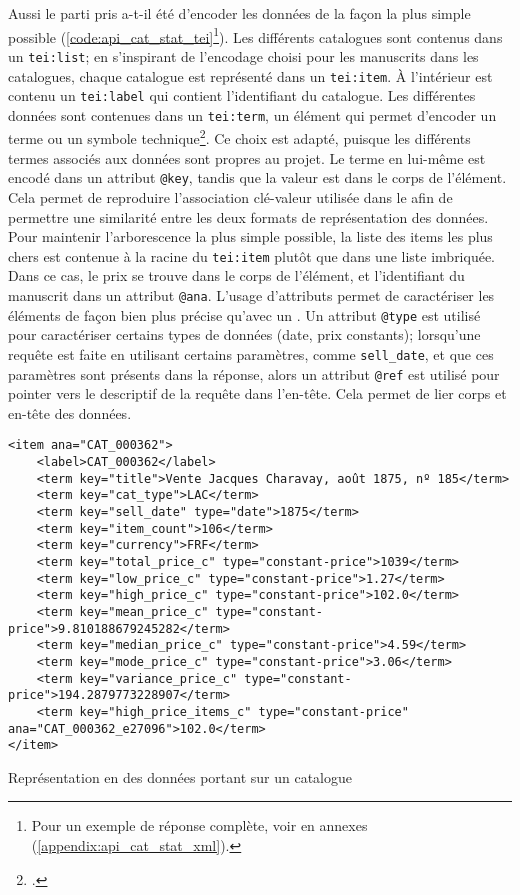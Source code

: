 Aussi le parti pris a-t-il été d'encoder les données de la façon la plus simple possible (\ref{code:api_cat_stat_tei}\footnote{
	Pour un exemple de réponse complète, voir en annexes (\ref{appendix:api_cat_stat_xml}).
}). Les différents catalogues sont contenus dans un \texttt{tei:list}; en s'inspirant de l'encodage choisi pour les manuscrits dans les catalogues, chaque catalogue est représenté dans un \texttt{tei:item}. À l'intérieur est contenu un \texttt{tei:label} qui contient l'identifiant du catalogue. Les différentes données sont contenues dans un \texttt{tei:term}, un élément qui permet d'encoder un terme ou un symbole technique\footcite{tei_consortium_p5_2022}. Ce choix est adapté, puisque les différents termes associés aux données sont propres au projet. Le terme en lui-même est encodé dans un attribut \texttt{@key}, tandis que la valeur est dans le corps de l'élément. Cela permet de reproduire l'association clé-valeur utilisée dans le \json{} afin de permettre une similarité entre les deux formats de représentation des données. Pour maintenir l'arborescence la plus simple possible, la liste des items les plus chers est contenue à la racine du \texttt{tei:item} plutôt que dans une liste imbriquée. Dans ce cas, le prix se trouve dans le corps de l'élément, et l'identifiant du manuscrit dans un attribut \texttt{@ana}. L'usage d'attributs permet de caractériser les éléments de façon bien plus précise qu'avec un \json{}. Un attribut \texttt{@type} est utilisé pour caractériser certains types de données (date, prix constants); lorsqu'une requête est faite en utilisant certains paramètres, comme \texttt{sell\_date}, et que ces paramètres sont présents dans la réponse, alors un attribut \texttt{@ref} est utilisé pour pointer vers le descriptif de la requête dans l'en-tête. Cela permet de lier corps et en-tête des données.

\begin{listing}[h!]
	\begin{verbatim}
<item ana="CAT_000362">
	<label>CAT_000362</label>
	<term key="title">Vente Jacques Charavay, août 1875, nº 185</term>
	<term key="cat_type">LAC</term>
	<term key="sell_date" type="date">1875</term>
	<term key="item_count">106</term>
	<term key="currency">FRF</term>
	<term key="total_price_c" type="constant-price">1039</term>
	<term key="low_price_c" type="constant-price">1.27</term>
	<term key="high_price_c" type="constant-price">102.0</term>
	<term key="mean_price_c" type="constant-price">9.810188679245282</term>
	<term key="median_price_c" type="constant-price">4.59</term>
	<term key="mode_price_c" type="constant-price">3.06</term>
	<term key="variance_price_c" type="constant-price">194.2879773228907</term>
	<term key="high_price_items_c" type="constant-price" ana="CAT_000362_e27096">102.0</term>
</item>
	\end{verbatim}
	\caption{Représentation en \xmltei{} des données portant sur un catalogue}
	\label{code:api_cat_stat_tei}
\end{listing}

